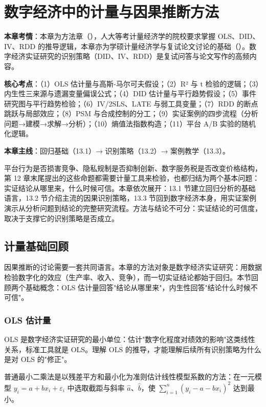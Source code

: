 \chapter{数字经济中的计量与因果推断方法}

\begin{examguide}
\textbf{本章考情}：本章为方法章（），人大等考计量经济学的院校要求掌握 OLS、DID、IV、RDD 的推导逻辑，本章亦为学硕计量经济学与复试论文讨论的基础（）。数字经济实证研究的识别策略（DID、IV、RDD）是复试问答与论文写作的高频内容。

\textbf{核心考点}：（1）OLS 估计量与高斯-马尔可夫假设；（2）R² 与 t 检验的逻辑；（3）内生性三来源与遗漏变量偏误公式；（4）DID 估计量与平行趋势假设；（5）事件研究图与平行趋势检验；（6）IV/2SLS、LATE 与弱工具变量；（7）RDD 的断点跳跃与局部效应；（8）PSM 与合成控制的分工；（9）实证案例的四步流程（分析问题→建模→求解→分析）；（10）熵值法指数构造；（11）平台 A/B 实验的随机化逻辑。

\textbf{本章主线}：回归基础（13.1）→ 识别策略（13.2）→ 案例教学（13.3）。
\end{examguide}

平台行为是否损害竞争、隐私规制是否抑制创新、数字服务税是否改变价格结构，第 12 章末尾提出的这些命题都需要计量工具来检验，也都归结为两个基本问题：实证结论从哪里来，什么时候可信。本章依次展开：13.1 节建立回归分析的基础语言，13.2 节介绍主流的因果识别策略，13.3 节回到数字经济本身，用实证案例演示从分析问题到结论的完整研究流程。方法与结论不可分：实证结论的可信度，取决于支撑它的识别策略是否成立。

\section{计量基础回顾}

因果推断的讨论需要一套共同语言。本章的方法对象是数字经济实证研究：用数据检验数字化的效应（生产率、收入、竞争），而一切实证结论都始于回归。本节回顾两个基础概念：OLS 估计量回答"结论从哪里来"，内生性回答"结论什么时候不可信"。

\subsection{OLS 估计量}

OLS 是数字经济实证研究的最小单位：估计"数字化程度对绩效的影响"这类线性关系，标准工具就是 OLS。理解 OLS 的推导，才能理解后续所有识别策略为什么是对 OLS 的"修正"。

\begin{definition}
普通最小二乘法是以残差平方和最小化为准则估计线性模型系数的方法：在一元模型 $y_i = a + b x_i + \varepsilon_i$ 中选取截距与斜率 $\hat a$、$\hat b$，使 $\sum_{i=1}^{n}(y_i - a - b x_i)^2$ 达到最小。
\end{definition}

